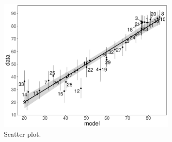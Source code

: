 \documentclass[11pt]{article}
\begin{document}
\begin{figure}[t]
  \centering
  \includegraphics[width=0.8\textwidth]{exp2_scatter}
  \caption{Scatter plot.}
  \label{fig:exp2_scatter}
\end{figure}

\afterpage{\clearpage}


% 
% 
\end{document}
